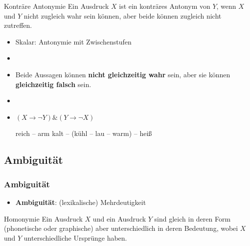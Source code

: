 
\begin{frame}

\begin{block}{Konträre Antonymie}
Ein Ausdruck $X$ ist ein konträres Antonym von $Y$, wenn $X$ und $Y$ nicht zugleich wahr sein können, aber beide können zugleich nicht zutreffen.
\end{block}

\begin{itemize}
	\item Skalar: Antonymie mit Zwischenstufen
	\item[]
	\item Beide Aussagen können \textbf{nicht gleichzeitig wahr} sein, aber sie können \textbf{gleichzeitig falsch} sein.
	\item[]
	\item $(X \rightarrow \lnot Y) \& (Y \rightarrow \lnot X)$
	
	\eal
		\ex reich -- arm
		\ex kalt -- (kühl -- lau -- warm) -- heiß
	\zl
	
\end{itemize}

\end{frame}


%
\subsection{Ambiguität}
%

\begin{frame}
\frametitle{Ambiguität}

\begin{itemize}
	\item \textbf{Ambiguität}: (lexikalische) Mehrdeutigkeit
\end{itemize}	

	
\begin{block}{Homonymie}
Ein Ausdruck $X$ und ein Ausdruck $Y$ sind gleich in deren Form (phonetische oder graphische) aber unterschiedlich in deren Bedeutung, wobei $X$ und $Y$ unterschiedliche Ursprünge haben.
\end{block}

\nocite{MyP18n} %

\end{frame}


